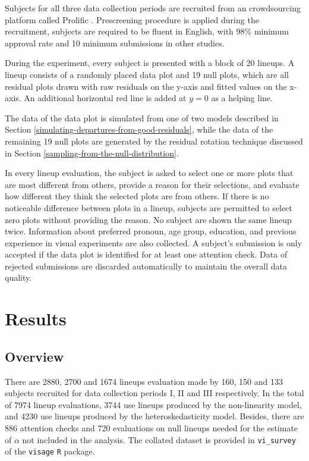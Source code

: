 \documentclass[]{interact}
\theoremstyle{plain}%
\theoremstyle{definition}
\theoremstyle{remark}
\begin{document}
Subjects for all three data collection periods are recruited from an
crowdsourcing platform called Prolific \citep{palan2018prolific}.
Prescreening procedure is applied during the recruitment, subjects are
required to be fluent in English, with \(98\%\) minimum approval rate
and 10 minimum submissions in other studies.

During the experiment, every subject is presented with a block of 20
lineups. A lineup consists of a randomly placed data plot and 19 null
plots, which are all residual plots drawn with raw residuals on the
y-axis and fitted values on the x-axis. An additional horizontal red
line is added at \(y = 0\) as a helping line.

The data of the data plot is simulated from one of two models described
in Section \ref{simulating-departures-from-good-residuals}, while the
data of the remaining 19 null plots are generated by the residual
rotation technique discussed in Section
\ref{sampling-from-the-null-distribution}.

In every lineup evaluation, the subject is asked to select one or more
plots that are most different from others, provide a reason for their
selections, and evaluate how different they think the selected plots are
from others. If there is no noticeable difference between plots in a
lineup, subjects are permitted to select zero plots without providing
the reason. No subject are shown the same lineup twice. Information
about preferred pronoun, age group, education, and previous experience
in visual experiments are also collected. A subject's submission is only
accepted if the data plot is identified for at least one attention
check. Data of rejected submissions are discarded automatically to
maintain the overall data quality.

\hypertarget{results}{%
\section{Results}\label{results}}

\hypertarget{overview}{%
\subsection{Overview}\label{overview}}

There are 2880, 2700 and 1674 lineups evaluation made by 160, 150 and
133 subjects recruited for data collection periods I, II and III
respectively. In the total of 7974 lineup evaluations, 3744 use lineups
produced by the non-linearity model, and 4230 use lineups produced by
the heteroskedasticity model. Besides, there are 886 attention checks
and 720 evaluations on null lineups needed for the estimate of
\(\alpha\) not included in the analysis. The collated dataset is
provided in \texttt{vi\_survey} of the \texttt{visage} \texttt{R}
package.
\end{document}

